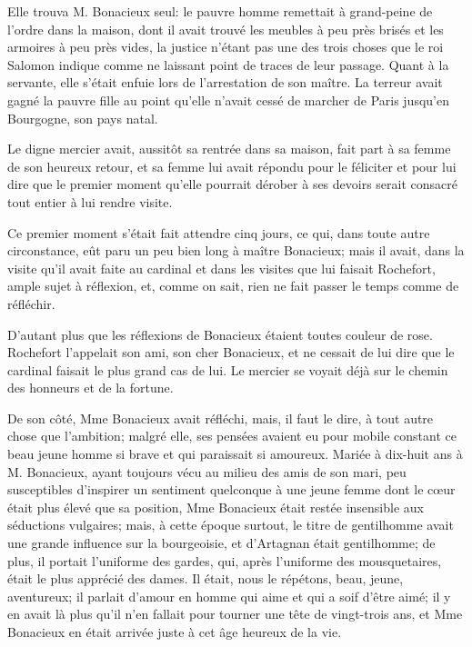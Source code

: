 Elle trouva M. Bonacieux seul: le pauvre homme remettait à grand-peine de l'ordre dans la maison, dont il avait trouvé les meubles à peu près brisés et les armoires à peu près vides, la justice n'étant pas une des trois choses que le roi Salomon indique comme ne laissant point de traces de leur passage. Quant à la servante, elle s'était enfuie lors de l'arrestation de son maître. La terreur avait gagné la pauvre fille au point qu'elle n'avait cessé de marcher de Paris jusqu'en Bourgogne, son pays natal. 

Le digne mercier avait, aussitôt sa rentrée dans sa maison, fait part à sa femme de son heureux retour, et sa femme lui avait répondu pour le féliciter et pour lui dire que le premier moment qu'elle pourrait dérober à ses devoirs serait consacré tout entier à lui rendre visite. 

Ce premier moment s'était fait attendre cinq jours, ce qui, dans toute autre circonstance, eût paru un peu bien long à maître Bonacieux; mais il avait, dans la visite qu'il avait faite au cardinal et dans les visites que lui faisait Rochefort, ample sujet à réflexion, et, comme on sait, rien ne fait passer le temps comme de réfléchir. 

D'autant plus que les réflexions de Bonacieux étaient toutes couleur de rose. Rochefort l'appelait son ami, son cher Bonacieux, et ne cessait de lui dire que le cardinal faisait le plus grand cas de lui. Le mercier se voyait déjà sur le chemin des honneurs et de la fortune. 

De son côté, Mme Bonacieux avait réfléchi, mais, il faut le dire, à tout autre chose que l'ambition; malgré elle, ses pensées avaient eu pour mobile constant ce beau jeune homme si brave et qui paraissait si amoureux. Mariée à dix-huit ans à M. Bonacieux, ayant toujours vécu au milieu des amis de son mari, peu susceptibles d'inspirer un sentiment quelconque à une jeune femme dont le cœur était plus élevé que sa position, Mme Bonacieux était restée insensible aux séductions vulgaires; mais, à cette époque surtout, le titre de gentilhomme avait une grande influence sur la bourgeoisie, et d'Artagnan était gentilhomme; de plus, il portait l'uniforme des gardes, qui, après l'uniforme des mousquetaires, était le plus apprécié des dames. Il était, nous le répétons, beau, jeune, aventureux; il parlait d'amour en homme qui aime et qui a soif d'être aimé; il y en avait là plus qu'il n'en fallait pour tourner une tête de vingt-trois ans, et Mme Bonacieux en était arrivée juste à cet âge heureux de la vie. 

